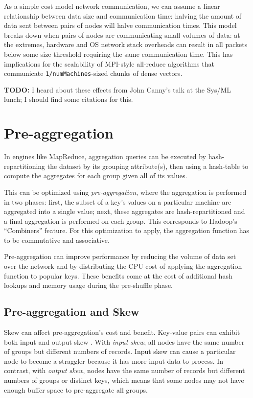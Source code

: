 \documentclass[12pt]{article}
\begin{document}
As a simple cost model network communication, we can assume a linear relationship between data size and communication time: halving the amount of data sent between pairs of nodes will halve communication times.
This model breaks down when pairs of nodes are communicating small volumes of data: at the extremes, hardware and OS network stack overheads can result in all packets below some size threshold requiring the same communication time.
This has implications for the scalability of MPI-style all-reduce algorithms that communicate \texttt{1/numMachines}-sized chunks of dense vectors.

\textbf{TODO:} I heard about these effects from John Canny's talk at the Sys/ML lunch; I should find some citations for this.


\section{Pre-aggregation}

In engines like MapReduce, aggregation queries can be executed by
hash-repartitioning the dataset by its grouping attribute(s), then using
a hash-table to compute the aggregates for each group given all of its values.

This can be optimized using \emph{pre-aggregation}, where the aggregation is
performed in two phases: first, the subset of a key's values on a particular
machine are aggregated into a single value; next, these aggregates are
hash-repartitioned and a final aggregation is performed on each group.
This corresponds to Hadoop's ``Combiners'' feature.
For this optimization to apply, the aggregation function has to be commutative
and associative.

Pre-aggregation can improve performance by reducing the volume of data set
over the network and by distributing the CPU cost of applying the aggregation
function to popular keys.
These benefits come at the cost of additional hash lookups and memory usage
during the pre-shuffle phase.

\subsection{Pre-aggregation and Skew}

Skew can affect pre-aggregation's cost and benefit.  Key-value pairs can exhibit both input and output skew \cite{adaptive-aggregation}.
With \emph{input skew}, all nodes have the same number of groups but different numbers of records.  Input skew can cause a particular node to become a straggler because it has more input data to process.  In contrast, with \emph{output skew}, nodes have the same number of records but different numbers of groups or distinct keys, which means that some nodes may not have enough buffer space to pre-aggregate all groups.
\end{document}
